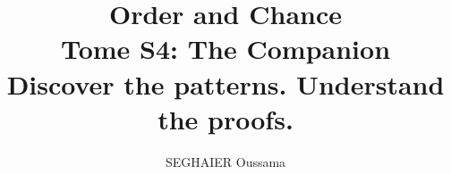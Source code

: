 \documentclass[11pt,openany]{book}
\title{\Huge\textbf{Order and Chance}\\[0.4em]\LARGE Tome S4: The Companion\\[0.6em]
\Large Discover the patterns. Understand the proofs.}
\author{SEGHAIER Oussama}
\date{\the\year}
\begin{document}
\frontmatter
\makecover
\maketitle

\tableofcontents

\mainmatter











\end{document}

